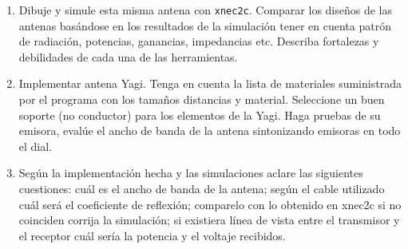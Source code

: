 \documentclass[onecolumn]{article}
\begin{document}
{\begin{enumerate}
\item Dibuje y simule esta misma antena con {\tt xnec2c}. Comparar los
    diseños de las antenas basándose en los resultados de la simulación
    tener en cuenta patrón de radiación, potencias, ganancias, impedancias
    etc. Describa fortalezas y debilidades de cada una de las
    herramientas.



\item  Implementar  antena Yagi. Tenga en cuenta la lista de materiales
    suministrada por el programa con los tamaños distancias y material.
    Seleccione un buen soporte (no conductor) para los elementos de la
    Yagi. Haga pruebas de su emisora, evalúe el ancho de banda de la antena
    sintonizando emisoras en todo el dial.

\item Según la implementación hecha y las simulaciones aclare las
    siguientes cuestiones: cuál es el ancho de banda de la antena; según el
    cable utilizado cuál será el coeficiente de reflexión; comparelo con lo
    obtenido en xnec2c si no coinciden corrija la simulación;
    si existiera
    línea de vista entre el transmisor y el receptor cuál sería la potencia
    y el voltaje recibidos.













\end{enumerate}
}
\end{document}
